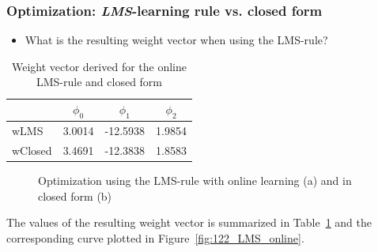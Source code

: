 \documentclass[a4]{article}
\begin{document}
\subsubsection{Optimization: \emph{LMS}-learning rule vs. closed form}
%
%
\begin{itemize}
	\item What is the resulting weight vector when using the LMS-rule?
\end{itemize}
\begin{table} [tbp!]
	\caption{Weight vector derived for the online LMS-rule and closed form}
	\centering
	\label{table:wLMS}
	\begin{tabular}{l c c c}
		\toprule
		& $\phi_0$ & $\phi_1$ & $\phi_2$ \\ 
		\midrule
		wLMS & 3.0014  & -12.5938  &  1.9854 \\
		wClosed &  3.4691  & -12.3838  &  1.8583  \\
		\bottomrule
	\end{tabular}
\end{table}
\begin{figure}[!h]
	\centering
	\caption{Optimization using the LMS-rule with online learning (a) and in closed form (b)}
	\label{fig:122_LMS}
\end{figure}
The values of the resulting weight vector is summarized in Table~\ref{table:wLMS} and the corresponding curve plotted in Figure~\ref{fig:122_LMS_online}.
\end{document}
